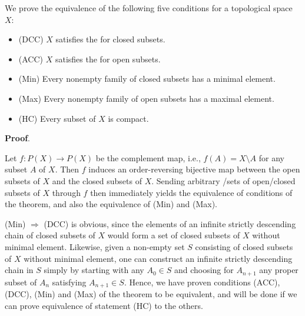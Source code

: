 \documentclass[12pt]{article}
\begin{document}

We prove the equivalence of the following five conditions for a topological space $X$:

\begin{itemize}
\item (DCC) $X$ satisfies the  for closed subsets.
\item (ACC) $X$ satisfies the  for open subsets.
\item (Min) Every nonempty family of closed subsets has a minimal element.
\item (Max) Every nonempty family of open subsets has a maximal element.
\item (HC) Every subset of $X$ is compact.
\end{itemize}

{\bf Proof}.

Let $f\colon P(X) \to P(X)$ be the complement map,
i.e., $f(A) = X \setminus A$ for any subset $A$ of $X$.
Then $f$ induces an order-reversing bijective map
between the open subsets of $X$ and the closed subsets of $X$.
Sending arbitrary /sets
of open/closed subsets of $X$ through $f$
then immediately yields the equivalence of conditions  of the theorem, and also the equivalence of (Min) and (Max).

(Min) $\Rightarrow$ (DCC) is obvious, since the elements of
an infinite strictly descending chain of closed subsets of $X$
would form a set of closed subsets of $X$ without minimal element.
Likewise, given a non-empty set $S$
consisting of closed subsets of $X$ without minimal element,
one can construct an infinite strictly descending chain in $S$
simply by starting with any $A_0 \in S$ and choosing for $A_{n+1}$
any proper subset of $A_n$ satisfying $A_{n+1} \in S$.
Hence, we have proven conditions (ACC), (DCC), (Min) and (Max) of the theorem
to be equivalent,
and will be done if we can prove equivalence of statement (HC) to the others.
\end{document}
